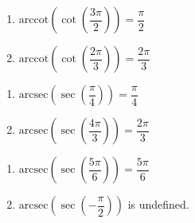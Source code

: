 \documentclass{ximera}
\begin{document}
\begin{multicols}{2}

\begin{enumerate}

\setcounter{enumi}{\value{HW}}

\item  $\text{arccot}\left(\cot\left(\dfrac{3\pi}{2}\right) \right) = \dfrac{\pi}{2}$
\item  $\text{arccot}\left(\cot\left(\dfrac{2\pi}{3}\right) \right) = \dfrac{2\pi}{3}$

\setcounter{HW}{\value{enumi}}

\end{enumerate}

\end{multicols}


\begin{multicols}{2}

\begin{enumerate}

\setcounter{enumi}{\value{HW}}

\item  $\text{arcsec}\left(\sec\left(\dfrac{\pi}{4}\right) \right) = \dfrac{\pi}{4}$ 
\item  $\text{arcsec}\left(\sec\left(\dfrac{4\pi}{3}\right) \right) = \dfrac{2\pi}{3}$

\setcounter{HW}{\value{enumi}}

\end{enumerate}

\end{multicols}

\begin{multicols}{2}

\begin{enumerate}

\setcounter{enumi}{\value{HW}}

\item  $\text{arcsec}\left(\sec\left( \dfrac{5\pi}{6} \right) \right) = \dfrac{5\pi}{6}$
\item  $\text{arcsec}\left(\sec\left(-\dfrac{\pi}{2} \right) \right)$ is undefined. 

\setcounter{HW}{\value{enumi}}

\end{enumerate}

\end{multicols}
\end{document}
